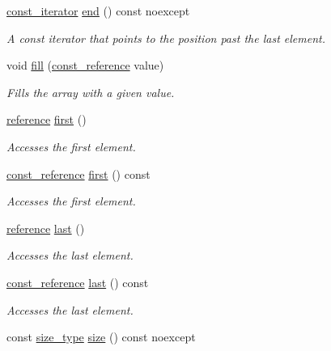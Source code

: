 \begin{DoxyCompactItemize}
\hyperlink{classprism_1_1_array_a187e11a8ec836c0b69b96b51fba73164}{const\+\_\+iterator} \hyperlink{classprism_1_1_array_afdce2e9b31d2c17e3c63a378b9160989}{end} () const  noexcept
\begin{DoxyCompactList}\small\item\em A const iterator that points to the position past the last element. \end{DoxyCompactList}\item 
void \hyperlink{classprism_1_1_array_a2fbe9e37073c724df02379ee88e35386}{fill} (\hyperlink{classprism_1_1_array_a16161ca6c0027dfa1a7c678e820eedc3}{const\+\_\+reference} value)
\begin{DoxyCompactList}\small\item\em Fills the array with a given value. \end{DoxyCompactList}\item 
\hyperlink{classprism_1_1_array_a00d78e61fb0a47489aff55b88ae9ebaa}{reference} \hyperlink{classprism_1_1_array_a65932e44ca21576c9f22b7e8de7ebe82}{first} ()
\begin{DoxyCompactList}\small\item\em Accesses the first element. \end{DoxyCompactList}\item 
\hyperlink{classprism_1_1_array_a16161ca6c0027dfa1a7c678e820eedc3}{const\+\_\+reference} \hyperlink{classprism_1_1_array_adf71e772e127cf0ccf836947fe72af0d}{first} () const 
\begin{DoxyCompactList}\small\item\em Accesses the first element. \end{DoxyCompactList}\item 
\hyperlink{classprism_1_1_array_a00d78e61fb0a47489aff55b88ae9ebaa}{reference} \hyperlink{classprism_1_1_array_ac1d0ffad9ac8ec1c37f129656d4db63e}{last} ()
\begin{DoxyCompactList}\small\item\em Accesses the last element. \end{DoxyCompactList}\item 
\hyperlink{classprism_1_1_array_a16161ca6c0027dfa1a7c678e820eedc3}{const\+\_\+reference} \hyperlink{classprism_1_1_array_a0f0f97e62e654d23531f805c54f67354}{last} () const 
\begin{DoxyCompactList}\small\item\em Accesses the last element. \end{DoxyCompactList}\item 
const \hyperlink{classprism_1_1_array_a91c89205e41d0e7825562343bfde3f1b}{size\+\_\+type} \hyperlink{classprism_1_1_array_a6267b9849168f7abc2eb80764e3d71a4}{size} () const  noexcept

\end{DoxyCompactItemize}
